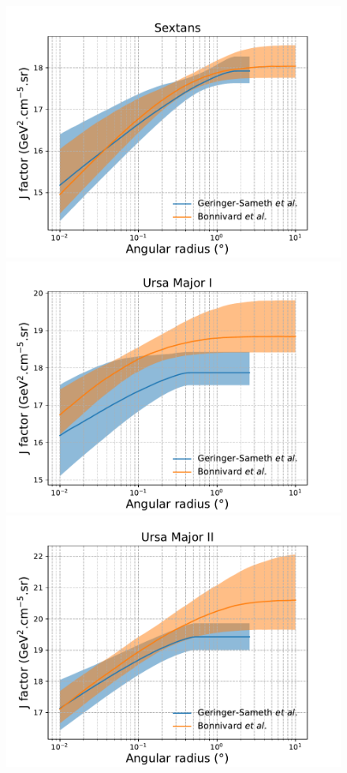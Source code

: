 \begin{figure}[ht]
{    \includegraphics[scale=0.32]{figures/glory_duck/appendix/Sextans.pdf}
    \includegraphics[scale=0.32]{figures/glory_duck/appendix/UrsaMajorI.pdf}
    \includegraphics[scale=0.32]{figures/glory_duck/appendix/UrsaMajorII.pdf}
}
\end{figure}
